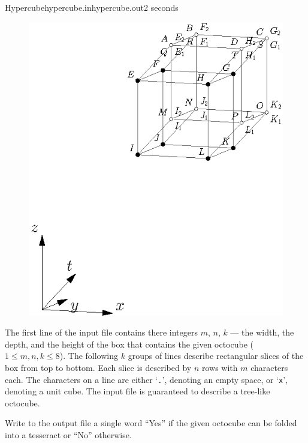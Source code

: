 \begin{problem}{Hypercube}{hypercube.in}{hypercube.out}{2 seconds}
\begin{figure}[h!]
\begin{minipage}[b]{0.5\textwidth}
\centering\includegraphics{pics/hypercube4.eps}
\end{minipage}%
\end{figure}

\InputFile

The first line of the input file contains there integers $m$, $n$, $k$ --- 
the width, the depth, and the height of the box that contains the given octocube
($1 \le m, n, k \le 8$). The following $k$ groups of lines describe rectangular slices of the box from top to bottom. 
Each slice is described by $n$ rows with $m$ characters each. The characters on a line are either `\texttt{.}', 
denoting an empty space, or `\texttt{x}', denoting a unit cube.
The input file is guaranteed to describe a tree-like octocube.  

\OutputFile

Write to the output file a single word ``Yes'' if the given octocube can be folded into a tesseract 
or ``No'' otherwise.

\Example

\begin{example}
%
%
\end{example}

\end{problem}
